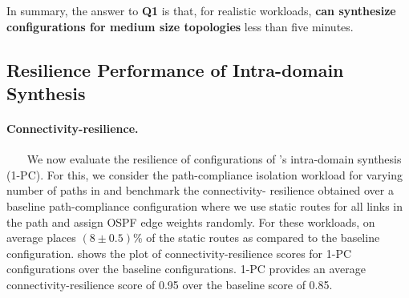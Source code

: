 In summary, the answer to \textbf{Q1} is that, for realistic workloads,
\textbf{\name can synthesize configurations for medium size
topologies} less than five minutes.


\subsection{Resilience Performance of Intra-domain Synthesis} \label{sec:reseval}
\paragraph{Connectivity-resilience.}~~~
We now evaluate the resilience of configurations 
of \name's intra-domain synthesis (1-PC).
For this, 
we consider the path-compliance isolation workload for
varying number of paths 
in  and benchmark the connectivity-
resilience obtained over a baseline path-compliance 
configuration 
where we use static routes for all links in the path and 
assign OSPF edge weights randomly. For these workloads,
\name on average places 
$(8 \pm 0.5)$\% of the static routes as 
compared to the baseline configuration. 
shows the plot of connectivity-resilience scores for 
1-PC configurations over the baseline configurations. 
1-PC provides an average connectivity-resilience score 
of 0.95 over the baseline score 
of 0.85.

